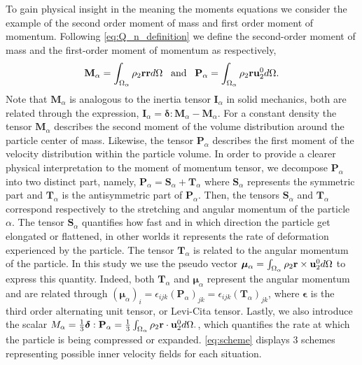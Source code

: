 To gain physical insight in the meaning the moments equations we consider the example of the second order moment of mass and first order moment of momentum.
Following \ref{eq:Q_n_definition} we define the second-order moment of mass and the first-order moment of momentum as respectively,
\begin{equation}
    \textbf{M}_\alpha 
    = \int_{\Omega_\alpha}  \rho_2 \textbf{r} \textbf{r}  d\Omega
    \;\;\;\text{and}\;\;\;
    \textbf{P}_\alpha 
    = \int_{\Omega_\alpha}  \rho_2 \textbf{r} \textbf{u}_2^0  d\Omega.
    \label{eq:first_moment_of_momentum_def}
\end{equation}
Note that $\textbf{M}_\alpha$ is analogous to the inertia tensor $\textbf{I}_\alpha$ in solid mechanics, both are related through the expression, $\textbf{I}_\alpha = \bm\delta : \textbf{M}_\alpha - \textbf{M}_\alpha$.
For a constant density the tensor $\textbf{M}_\alpha$ describes the second moment of the volume distribution around the particle center of mass.
Likewise, the tensor $\textbf{P}_\alpha$ describes the first moment of the velocity distribution within the particle volume. 
In order to provide a clearer physical interpretation to the moment of momentum tensor, we decompose $\textbf{P}_\alpha$ into two distinct part, namely,
$\textbf{P}_\alpha = \textbf{S}_\alpha+\textbf{T}_\alpha$ where $\textbf{S}_\alpha$ represents the symmetric part and $\textbf{T}_\alpha$ is the antisymmetric part of $\textbf{P}_\alpha$.
Then, the tensors $\textbf{S}_\alpha$ and $\textbf{T}_\alpha$ correspond respectively to the stretching and angular momentum of the particle $\alpha$. 
The tensor $\textbf{S}_\alpha$ quantifies how fast and in which direction the particle get elongated or flattened, in other worlds it represents the rate of deformation experienced by the particle.
The tensor $\textbf{T}_\alpha$ is related to the angular momentum of the particle. 
In this study we use the pseudo vector $\bm{\mu}_\alpha = \int_{\Omega_\alpha}  \rho_2 \textbf{r} \times \textbf{u}_2^0  d\Omega$ to express this quantity. 
Indeed, both  $\textbf{T}_\alpha$ and $\bm{\mu}_\alpha$ represent the angular momentum and are related through $(\bm{\mu}_\alpha)_i = \epsilon_{ijk} (\textbf{P}_\alpha)_{jk}= \epsilon_{ijk} (\textbf{T}_\alpha)_{jk}$, where $\bm\epsilon$ is the third order alternating unit tensor, or Levi-Cita tensor. 
Lastly, we also introduce the scalar $M_\alpha =\frac{1}{3}\bm\delta : \textbf{P}_\alpha = \frac{1}{3}\int_{\Omega_\alpha}  \rho_2 \textbf{r} \cdot \textbf{u}_2^0  d\Omega.$, which quantifies the rate at which the particle is being compressed or expanded.
\ref{eq:scheme} displays 3 schemes representing possible  inner velocity fields for each situation. 
